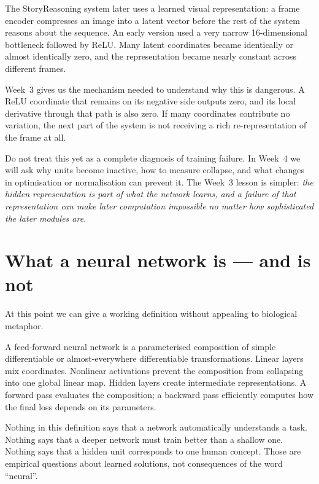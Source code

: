 \begin{architecturebox}
The StoryReasoning system later uses a learned visual representation: a frame encoder compresses an image into a latent vector before the rest of the system reasons about the sequence. An early version used a very narrow 16-dimensional bottleneck followed by ReLU. Many latent coordinates became identically or almost identically zero, and the representation became nearly constant across different frames.

Week~3 gives us the mechanism needed to understand why this is dangerous. A ReLU coordinate that remains on its negative side outputs zero, and its local derivative through that path is also zero. If many coordinates contribute no variation, the next part of the system is not receiving a rich re-representation of the frame at all.

Do not treat this yet as a complete diagnosis of training failure. In Week~4 we will ask why units become inactive, how to measure collapse, and what changes in optimisation or normalisation can prevent it. The Week~3 lesson is simpler: \emph{the hidden representation is part of what the network learns, and a failure of that representation can make later computation impossible no matter how sophisticated the later modules are.}
\end{architecturebox}

\section{What a neural network is --- and is not}

At this point we can give a working definition without appealing to biological metaphor.

A feed-forward neural network is a parameterised composition of simple differentiable or almost-everywhere differentiable transformations. Linear layers mix coordinates. Nonlinear activations prevent the composition from collapsing into one global linear map. Hidden layers create intermediate representations. A forward pass evaluates the composition; a backward pass efficiently computes how the final loss depends on its parameters.

Nothing in this definition says that a network automatically understands a task. Nothing says that a deeper network must train better than a shallow one. Nothing says that a hidden unit corresponds to one human concept. Those are empirical questions about learned solutions, not consequences of the word ``neural''.

